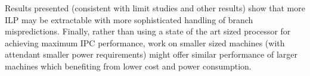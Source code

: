 \documentclass[10pt,dvips]{article}
\begin{document}
Results presented (consistent with limit studies and other
results) show that more ILP may be extractable with more
sophisticated handling of branch mispredictions.
Finally, rather than using a state of the art sized processor
for achieving maximum IPC performance, work on smaller sized machines
(with attendant smaller power requirements) might offer similar
performance of larger machines which benefiting from lower cost
and power consumption.
%


%
\end{document}
